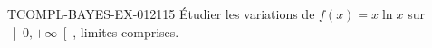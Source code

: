 \begin{exercice}{TCOMPL-BAYES-EX-012}{1}{15}
Étudier les variations de $f(x) = x\ln x$ sur $\left]0, +\infty\right[$, limites comprises.

\end{exercice}
